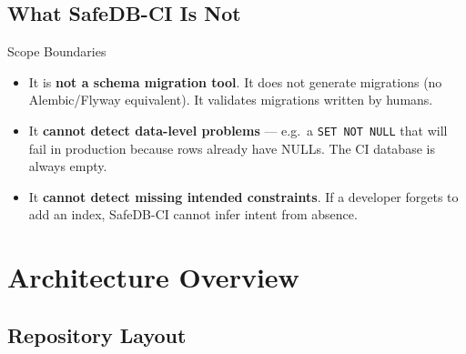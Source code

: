 \documentclass[12pt,a4paper]{report}
\begin{document}
\section{What SafeDB-CI Is Not}

\begin{warningbox}{Scope Boundaries}
\begin{itemize}
  \item It is \textbf{not a schema migration tool}. It does not generate migrations
        (no Alembic/Flyway equivalent). It validates migrations written by humans.
  \item It \textbf{cannot detect data-level problems} — e.g.\ a \texttt{SET NOT NULL}
        that will fail in production because rows already have NULLs. The CI database
        is always empty.
  \item It \textbf{cannot detect missing intended constraints}. If a developer forgets
        to add an index, SafeDB-CI cannot infer intent from absence.
\end{itemize}
\end{warningbox}

\chapter{Architecture Overview}

\section{Repository Layout}
\end{document}
